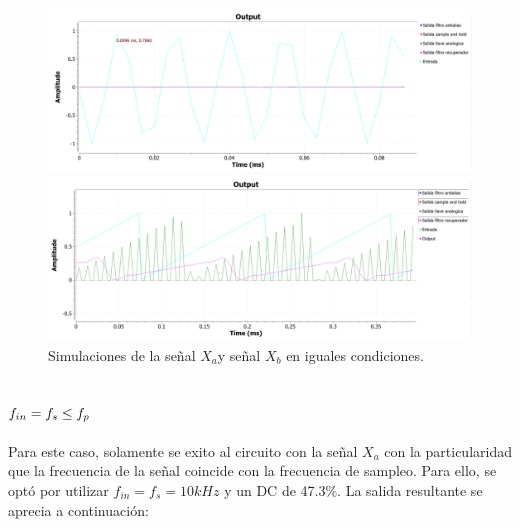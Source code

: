 \documentclass[../../ASSD_TP1_G7.tex]{subfiles}
\begin{document}
\begin{figure}[H]

\begin{centering}
\includegraphics[scale=0.5]{Imagenes/simulacion_llave_seno_b2}
\par\end{centering}
\centering{}\includegraphics[scale=0.5]{Imagenes/simulacion_llave_diente_b2}\caption{Simulaciones de la señal $X_{a}$y señal $X_{b}$ en iguales condiciones.}
\end{figure}


\subsection{$f_{in}=f_{s}\protect\leq f_{p}$}

Para este caso, solamente se exito al circuito con la señal $X_{a}$
con la particularidad que la frecuencia de la señal coincide con la
frecuencia de sampleo. Para ello, se optó por utilizar $f_{in}=f_{s}=10kHz$
y un DC de 47.3\%. La salida resultante se aprecia a continuación:
\end{document}

